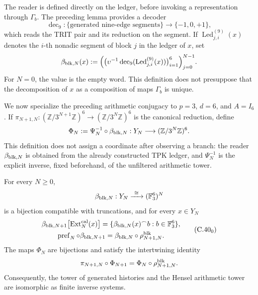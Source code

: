 The reader is defined directly on the ledger, before invoking a
representation through \(\Gamma_b\). The preceding lemma provides a
decoder
\[
 \operatorname{dec}_9:\{\text{generated nine-edge segments}\}
 \longrightarrow\{-1,0,+1\},
\]
which reads the TRIT pair and its reduction on the segment. If
\(\operatorname{Led}^{(9)}_{j,i}(x)\) denotes the \(i\)-th nonadic segment
of block \(j\) in the ledger of \(x\), set
\begin{equation}
 \beta_{{\rm blk},N}(x):=
 \Bigl(
   \bigl(\upsilon^{-1}\operatorname{dec}_9
          (\operatorname{Led}^{(9)}_{j,i}(x))\bigr)_{i=1}^{6}
 \Bigr)_{j=0}^{N-1}.
 \label{eq:lector-bloques-ch}
\end{equation}
For \(N=0\), the value is the empty word. This definition does not presuppose
that the decomposition of \(x\) as a composition of maps \(\Gamma_b\) is
unique.

We now specialize the preceding arithmetic conjugacy to
\(p=3\), \(d=6\), and \(A=I_6\). If
\(\pi_{N+1,N}:(\mathbb Z/3^{N+1}\mathbb Z)^6\to
(\mathbb Z/3^N\mathbb Z)^6\) is the canonical reduction, define
\begin{equation}
 \Phi_N:=\Psi_N^{-1}\circ\beta_{{\rm blk},N}:
 Y_N\longrightarrow(\mathbb Z/3^N\mathbb Z)^6.
 \label{eq:phi-hensel-bloques-ch}
\end{equation}
This definition does not assign a coordinate after observing a branch: the
reader \(\beta_{{\rm blk},N}\) is obtained from the already constructed TPK ledger, and
\(\Psi_N^{-1}\) is the explicit inverse, fixed beforehand, of the
unfiltered arithmetic tower.

\begin{proposition}
\label{prop:cobertura-729-seccion}
For every \(N\geq0\),
\[
 \beta_{{\rm blk},N}:Y_N\xrightarrow{\ \cong\ }
 (\mathbb F_3^6)^N
\]
is a bijection compatible with truncations, and for every \(x\in Y_N\)
\[
 \begin{gathered}
 \beta_{{\rm blk},N+1}
 \bigl[\operatorname{Ext}^{\rm cal}_N(x)\bigr]
 =\{\beta_{{\rm blk},N}(x)^\frown b:
       b\in\mathbb F_3^6\},\\
 \operatorname{pref}_N\circ\beta_{{\rm blk},N+1}
 =\beta_{{\rm blk},N}\circ\rho^{\rm blk}_{N+1,N}.
 \end{gathered}
\tag{C.40$_0$}
\label{eq:cobertura-729-ch}
\]
The maps \(\Phi_N\) are bijections and satisfy the intertwining identity
\begin{equation}
 \pi_{N+1,N}\circ\Phi_{N+1}
 =\Phi_N\circ\rho^{\rm blk}_{N+1,N}.
 \label{eq:entrelazamiento-hensel-ext-ch}
\end{equation}
Consequently, the tower of generated histories and the Hensel arithmetic
tower are isomorphic as finite inverse systems.
\end{proposition}

